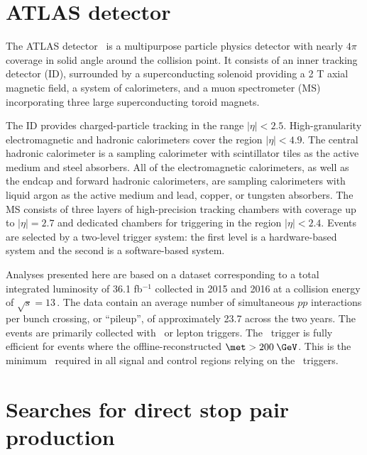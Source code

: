 \documentclass[UKenglish,10pt]{article}
\begin{document}
\section{ATLAS detector}

The ATLAS detector~\cite{PERF-2007-01} is a multipurpose particle physics detector with nearly $4\pi$ coverage in solid angle around the collision point. It consists of an inner tracking detector (ID), surrounded by a superconducting solenoid providing a 2 T axial magnetic field, a system of calorimeters, and a muon spectrometer (MS) incorporating three large superconducting toroid magnets.
\vspace{0.20cm}

\hspace{-0.60cm}
The ID provides charged-particle tracking in the range $|\eta| < 2.5$. High-granularity electromagnetic and hadronic calorimeters cover the region $|\eta| < 4.9$. The central hadronic calorimeter is a sampling calorimeter with scintillator tiles as the active medium and steel absorbers. All of the electromagnetic calorimeters, as well as the endcap and forward hadronic calorimeters, are sampling calorimeters with liquid argon as the active medium and lead, copper, or tungsten absorbers. The MS consists of three layers of high-precision tracking chambers with coverage up to $|\eta|=2.7$ and dedicated chambers for triggering in the region $|\eta|<2.4$. Events are selected by a two-level trigger system: the first level is a hardware-based system and the second is a software-based system. 
\vspace{0.20cm}

\hspace{-0.60cm}
Analyses presented here are based on a dataset corresponding to a total integrated luminosity of 36.1 fb$^{-1}$ collected in 2015 and 2016 at a collision energy of $\sqrt{s} = 13$\,\TeV. The data contain an average number of simultaneous $pp$ interactions per bunch crossing, or ``pileup'', of approximately 23.7 across the two years. The events are primarily collected with \met\ or lepton triggers. The \met\ trigger is fully efficient for events where the offline-reconstructed $\met > 200$\,$\GeV$. This is the minimum \met\ required in all signal and control regions relying on the \met\ triggers. 

\section{Searches for direct stop pair production}
\end{document}
